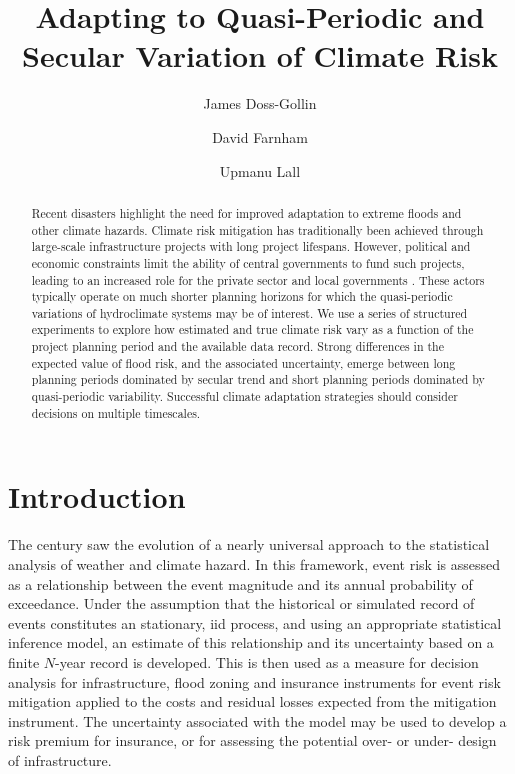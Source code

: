\documentclass[12pt]{article}
\title{Adapting to Quasi-Periodic and Secular Variation of Climate Risk}
\author[1,2]{James Doss-Gollin}
\author[1,2]{David Farnham}
\author[1,2]{Upmanu Lall}
\affil[1]{Columbia Water Center, Columbia University}
\affil[2]{Department of Earth and Environmental Engineering, Columbia University}
\begin{document}
\maketitle
\RaggedRight{}

\begin{abstract}
  Recent disasters highlight the need for improved adaptation to extreme floods and other climate hazards.
  Climate risk mitigation has traditionally been achieved through large-scale infrastructure projects with long project lifespans.
  However, political and economic constraints limit the ability of central governments to fund such projects, leading to an increased role for the private sector and local governments \citep{WorldEconomicForum2016}.
  These actors typically operate on much shorter planning horizons for which the quasi-periodic variations of hydroclimate systems may be of interest.
  We use a series of structured experiments to explore how estimated and true climate risk vary as a function of the project planning period and the available data record.
  Strong differences in the expected value of flood risk, and the associated uncertainty, emerge between long planning periods dominated by secular trend and short planning periods dominated by quasi-periodic variability.
  Successful climate adaptation strategies should consider decisions on multiple timescales.
\end{abstract}


\section{Introduction}\label{sec:introduction}

The  century saw the evolution of a nearly universal approach to the statistical analysis of weather and climate hazard.
In this framework, event risk is assessed as a relationship between the event magnitude and its annual probability of exceedance.
Under the assumption that the historical or simulated record of events constitutes an stationary, \gls{iid} process, and using an appropriate statistical inference model, an estimate of this relationship and its uncertainty based on a finite $N$-year record is developed.
This is then used as a measure for decision analysis for infrastructure, flood zoning and insurance instruments for event risk mitigation applied to the costs and residual losses expected from the mitigation instrument.
The uncertainty associated with the model may be used to develop a risk premium for insurance, or for assessing the potential over- or under- design of infrastructure.
\end{document}
